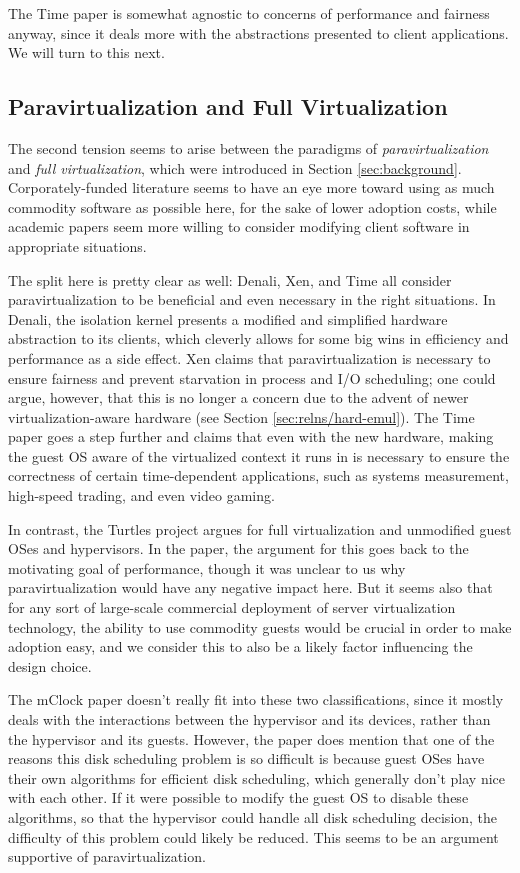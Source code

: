 \documentclass[letterpaper, twocolumn]{article}
\begin{document}
The Time paper is somewhat agnostic to concerns of performance and fairness anyway,
since it deals more with the abstractions presented to client applications.  We
will turn to this next.

\subsection{Paravirtualization and Full Virtualization}
\label{sec:relns/para-full}

The second tension seems to arise between the paradigms of \emph{paravirtualization}
and \emph{full virtualization}, which were introduced in Section \ref{sec:background}.
Corporately-funded literature seems to have an eye more toward using as much
commodity software as possible here, for the sake of lower adoption costs, while
academic papers seem more willing to consider modifying client software in
appropriate situations.

The split here is pretty clear as well: Denali, Xen, and Time all consider
paravirtualization to be beneficial and even necessary in the right situations.
In Denali, the isolation kernel presents a modified and simplified hardware abstraction
to its clients, which cleverly allows for some big wins in efficiency and performance
as a side effect.  Xen claims that paravirtualization is necessary to ensure fairness
and prevent starvation in process and I/O scheduling; one could argue, however, that
this is no longer a concern due to the advent of newer virtualization-aware hardware
(see Section \ref{sec:relns/hard-emul}).  The Time paper goes a step further and claims that
even with the new hardware, making the guest OS aware of the virtualized context it
runs in is necessary to ensure the correctness of certain time-dependent applications,
such as systems measurement, high-speed trading, and even video gaming.

In contrast, the Turtles project argues for full virtualization and unmodified guest
OSes and hypervisors.  In the paper, the argument for this goes back to the
motivating goal of performance, though it was unclear to us why paravirtualization
would have any negative impact here.  But it seems also that for any sort of large-scale
commercial deployment of server virtualization technology, the ability to use commodity
guests would be crucial in order to make adoption easy, and we consider this to also
be a likely factor influencing the design choice.

The mClock paper doesn't really fit into these two classifications, since it mostly
deals with the interactions between the hypervisor and its devices, rather than the hypervisor
and its guests.  However, the paper does mention that one of the reasons this disk
scheduling problem is so difficult is because guest OSes have their own algorithms
for efficient disk scheduling, which generally don't play nice with each other.  If it
were possible to modify the guest OS to disable these algorithms, so that the hypervisor
could handle all disk scheduling decision, the difficulty of this problem could likely
be reduced.  This seems to be an argument supportive of paravirtualization.
\end{document}

